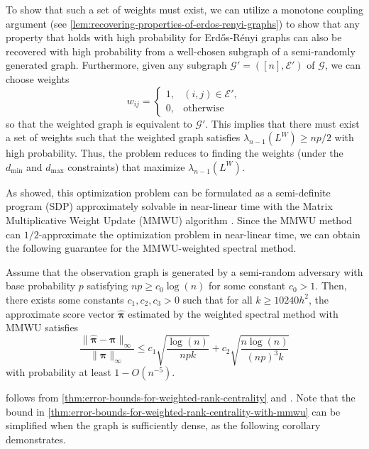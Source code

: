 \documentclass[sigconf,nonacm,pbalance]{acmart}
\begin{document}
To show that such a set of weights must exist, we can utilize a monotone coupling argument (see \cref{lem:recovering-properties-of-erdos-renyi-graphs}) to show that any property that holds with high probability for Erd\H{o}s-R\'{e}nyi graphs can also be recovered with high probability from a well-chosen subgraph of a semi-randomly generated graph. Furthermore, given any subgraph $\mathcal{G}'=([n], \mathcal{E}')$ of $\mathcal{G}$, we can choose weights
\begin{equation}
    w_{ij} = \begin{cases}
        1, & (i, j) \in \mathcal{E'}, \\
        0, & \text{otherwise}
    \end{cases}
\end{equation}
so that the weighted graph is equivalent to $\mathcal{G}'$. This implies that there must exist a set of weights such that the weighted graph satisfies $\lambda_{n-1}(L^W)\geq np/2$ with high probability. Thus, the problem reduces to finding the weights (under the $d_\text{min}$ and $d_\text{max}$ constraints) that maximize $\lambda_{n-1}(L^W)$.

As \cite{MonotoneAdversary} showed, this optimization problem can be formulated as a semi-definite program (SDP) approximately solvable in near-linear time with the Matrix Multiplicative Weight Update (MMWU) algorithm \cite[Algorithm 2]{MonotoneAdversary}. Since the MMWU method can $1/2$-approximate the optimization problem in near-linear time, we can obtain the following guarantee for the MMWU-weighted spectral method.
\begin{theorem}\label{thm:error-bounds-for-weighted-rank-centrality-with-mmwu}
Assume that the observation graph is generated by a semi-random adversary with base probability $p$ satisfying $np \geq c_0 \log(n)$ for some constant $c_0>1$. Then, there exists some constants $c_1,c_2,c_3>0$ such that for all
$k \geq 10240h^2$, the approximate score vector $\hat{\bm{\pi}}$ estimated by the weighted spectral method with MMWU \cite[Algorithm 2]{MonotoneAdversary} satisfies
\begin{equation}
\frac{\|\hat{\bm{\pi}}-\bm{\pi}\|_\infty}{\|\bm{\pi}\|_\infty} \leq c_1 \sqrt{\frac{\log(n)}{npk}} + c_2 \sqrt{\frac{n\log(n)}{(np)^3k}} 
\end{equation}
with probability at least $1-O(n^{-5})$.
\end{theorem}

 follows from \cref{thm:error-bounds-for-weighted-rank-centrality} and \cite[Theorem 10]{MonotoneAdversary}. Note that the bound in \cref{thm:error-bounds-for-weighted-rank-centrality-with-mmwu} can be simplified when the graph is sufficiently dense, as the following corollary demonstrates.
\end{document}
